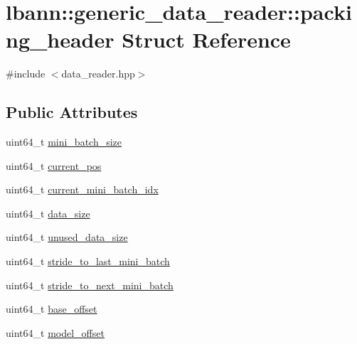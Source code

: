 \hypertarget{structlbann_1_1generic__data__reader_1_1packing__header}{}\section{lbann\+:\+:generic\+\_\+data\+\_\+reader\+:\+:packing\+\_\+header Struct Reference}
\label{structlbann_1_1generic__data__reader_1_1packing__header}


{\ttfamily \#include $<$data\+\_\+reader.\+hpp$>$}

\subsection*{Public Attributes}
\begin{DoxyCompactItemize}
\item 
uint64\+\_\+t \hyperlink{structlbann_1_1generic__data__reader_1_1packing__header_a400dc652d84e1e6b1faff964fd286434}{mini\+\_\+batch\+\_\+size}
\item 
uint64\+\_\+t \hyperlink{structlbann_1_1generic__data__reader_1_1packing__header_aeb876a4db2b88fde22be1d81ec7c1a65}{current\+\_\+pos}
\item 
uint64\+\_\+t \hyperlink{structlbann_1_1generic__data__reader_1_1packing__header_a8ad4d6f58ddccecee50977c4d72276af}{current\+\_\+mini\+\_\+batch\+\_\+idx}
\item 
uint64\+\_\+t \hyperlink{structlbann_1_1generic__data__reader_1_1packing__header_af894940b23cb11fac4f15faf5b1711f7}{data\+\_\+size}
\item 
uint64\+\_\+t \hyperlink{structlbann_1_1generic__data__reader_1_1packing__header_aa75d4dc948a928a3dc781b8b5b5de9e0}{unused\+\_\+data\+\_\+size}
\item 
uint64\+\_\+t \hyperlink{structlbann_1_1generic__data__reader_1_1packing__header_a51820dc8a7ae3c2543e0bad73e37950c}{stride\+\_\+to\+\_\+last\+\_\+mini\+\_\+batch}
\item 
uint64\+\_\+t \hyperlink{structlbann_1_1generic__data__reader_1_1packing__header_a2ea030d8edc09dceb272766757a582c2}{stride\+\_\+to\+\_\+next\+\_\+mini\+\_\+batch}
\item 
uint64\+\_\+t \hyperlink{structlbann_1_1generic__data__reader_1_1packing__header_a840503d79f00cf76873002b95fad7890}{base\+\_\+offset}
\item 
uint64\+\_\+t \hyperlink{structlbann_1_1generic__data__reader_1_1packing__header_a5bfd945b768627ade530628524cf8d2b}{model\+\_\+offset}

\end{DoxyCompactItemize}
